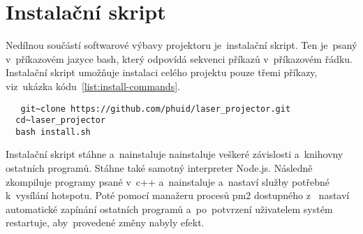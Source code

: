 





\section{Instalační skript}
Nedílnou součástí softwarové výbavy projektoru je~instalační skript.
Ten je~psaný  v~příkazovém jazyce bash, který odpovídá sekvenci příkazů  v~příkazovém řádku.
Instalační skript umožňuje instalaci celého projektu pouze třemi příkazy,  viz~ukázka kódu~\ref{list:install-commands}.

\begin{code}
\begin{verbatim}
   git~clone https://github.com/phuid/laser_projector.git
  cd~laser_projector
  bash install.sh
\end{verbatim}
\end{code}

Instalační skript stáhne  a~nainstaluje nainstaluje veškeré závislosti  a~knihovny ostatních programů. Stáhne také samotný interpreter Node.js.
Následně zkompiluje programy psané  v~c++  a~nainstaluje  a~nastaví služby potřebné  k~vysílání hotspotu. Poté pomocí manažeru procesů pm2 dostupného z~\cite{pm2} nastaví automatické zapínání ostatních programů  a~po~potvrzení uživatelem systém restartuje,  aby~provedené změny nabyly efekt.
